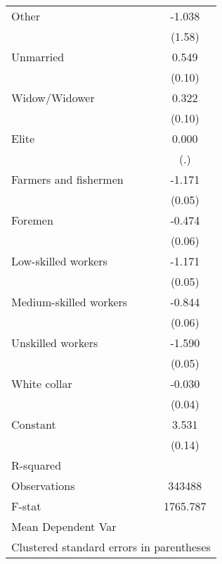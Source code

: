 {\begin{tabular}{l*{1}{c}}
Other               &      -1.038         \\
                    &      (1.58)         \\
Unmarried           &       0.549\sym{***}\\
                    &      (0.10)         \\
Widow/Widower       &       0.322\sym{***}\\
                    &      (0.10)         \\
Elite               &       0.000         \\
                    &         (.)         \\
Farmers and fishermen&      -1.171\sym{***}\\
                    &      (0.05)         \\
Foremen             &      -0.474\sym{***}\\
                    &      (0.06)         \\
Low-skilled workers &      -1.171\sym{***}\\
                    &      (0.05)         \\
Medium-skilled workers&      -0.844\sym{***}\\
                    &      (0.06)         \\
Unskilled workers   &      -1.590\sym{***}\\
                    &      (0.05)         \\
White collar        &      -0.030         \\
                    &      (0.04)         \\
Constant            &       3.531\sym{***}\\
                    &      (0.14)         \\
\hline
R-squared           &                     \\
Observations        &      343488         \\
F-stat              &    1765.787         \\
Mean Dependent Var  &                     \\
\hline\hline
\multicolumn{2}{l}{\footnotesize Clustered standard errors in parentheses}\\
\end{tabular}
}
